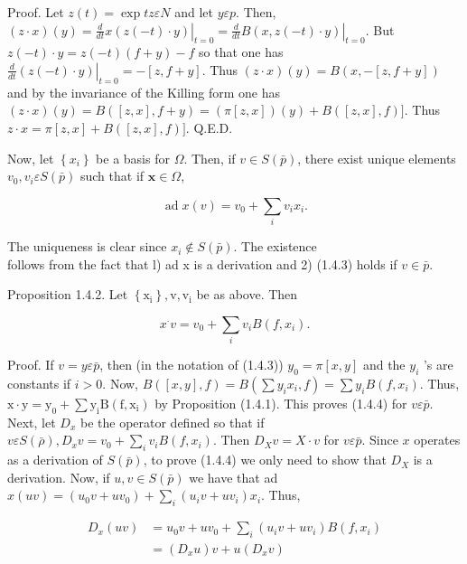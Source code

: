 \documentclass[10pt]{article}
\begin{document}
Proof. Let $z(t)=\exp t z \varepsilon N$ and let $y \varepsilon p$. Then, $(z \cdot x)(y)=\left.\frac{d}{d t} x(z(-t) \cdot y)\right|_{t=0}=\left.\frac{d}{d t} B(x, z(-t) \cdot y)\right|_{t=0}$. But $z(-t) \cdot y=z(-t)(f+y)-f$ so that one has $\left.\frac{d}{d t}(z(-t) \cdot y)\right|_{t=0}=-[z, f+y]$. Thus $(z \cdot x)(y)=B(x,-[z, f+y])$ and by the invariance of the Killing form one has $(z \cdot x)(y)=B([z, x], f+y)=(\pi[z, x])(y)+B([z, x], f)]$. Thus $z \cdot x=\pi[z, x]+B([z, x], f)]$. Q.E.D.

Now, let $\left\{x_{i}\right\}$ be a basis for $\Omega$. Then, if $v \in S(\bar{p})$, there exist unique elements $v_{0}, v_{i} \varepsilon S(\bar{p})$ such that if $\mathbf{x} \in \Omega$,


\begin{equation*}
\operatorname{ad} x(v)=v_{0}+\sum_{i} v_{i} x_{i} . \tag{1.4.3}
\end{equation*}


The uniqueness is clear since $x_{i} \notin S(\bar{p})$. The existence\\
follows from the fact that l) ad x is a derivation and 2) (1.4.3) holds if $v \in \bar{p}$.

Proposition 1.4.2. Let $\left\{\mathrm{x}_{\mathrm{i}}\right\}, \mathrm{v}, \mathrm{v}_{\mathrm{i}}$ be as above. Then


\begin{equation*}
x^{\cdot} v=v_{0}+\sum_{i} v_{i} B\left(f, x_{i}\right) . \tag{1.4.4}
\end{equation*}


Proof. If $v=y \varepsilon \bar{p}$, then (in the notation of (1.4.3)) $y_{0}=\pi[x, y]$ and the $y_{i}$ 's are constants if $i>0$. Now, $B([x, y], f)=B\left(\sum y_{i} x_{i}, f\right)=\sum y_{i} B\left(f, x_{i}\right)$. Thus, $\mathrm{x} \cdot \mathrm{y}=\mathrm{y}_{0}+\sum \mathrm{y}_{\mathrm{i}} \mathrm{B}\left(\mathrm{f}, \mathrm{x}_{\mathrm{i}}\right)$ by Proposition (1.4.1). This proves (1.4.4) for $v \varepsilon \bar{p}$. Next, let $D_{x}$ be the operator defined so that if $v \varepsilon S(\bar{\rho}), D_{x} v=v_{0}+\sum_{i} v_{i} B\left(f, x_{i}\right)$. Then $D_{X} v=X \cdot v$ for $v \varepsilon \bar{p}$. Since $x$ operates as a derivation of $S(\bar{p})$, to prove (1.4.4) we only need to show that $D_{X}$ is a derivation. Now, if $u, v \in S(\bar{p})$ we have that ad $x(u v)=\left(u_{0} v+u v_{0}\right)+\sum_{i}\left(u_{i} v+u v_{i}\right) x_{i}$. Thus,

$$
\begin{aligned}
D_{x}(u v) & =u_{0} v+u v_{0}+\sum_{i}\left(u_{i} v+u v_{i}\right) B\left(f, x_{i}\right) \\
& =\left(D_{x} u\right) v+u\left(D_{x} v\right)
\end{aligned}
$$
\end{document}
